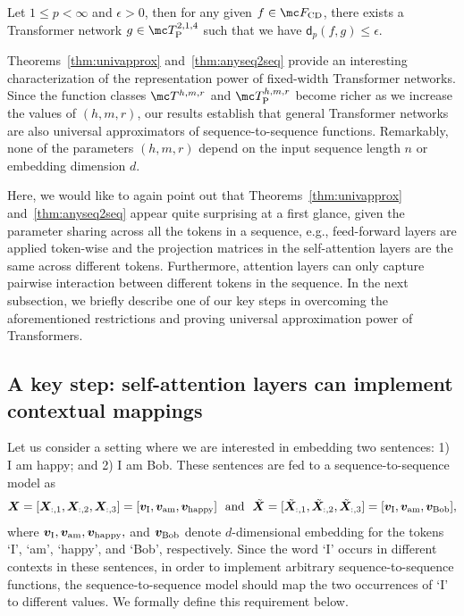 \documentclass{article} %
\def\vv{{\bm{v}}}
\def\mX{{\bm{X}}}
\newcommand{\funcdist}{\mathsf{d}}
\begin{document}
\begin{theorem}
\label{thm:anyseq2seq}
Let $1 \leq p < \infty$ and $\epsilon > 0$, then for any given $f \in \mc F_{\rm CD}$, there exists a Transformer network $g \in \mc T^{2,1,4}_{\rm P}$ such that we have $\funcdist_p(f,g) \leq \epsilon$. 
\end{theorem}
\vspace{-2pt}
Theorems~\ref{thm:univapprox} and~\ref{thm:anyseq2seq} provide an interesting characterization of the representation power of fixed-width Transformer networks. Since the function classes $\mc T^{h, m, r}$ and $\mc T^{h, m, r}_{\rm P}$ become richer as we increase the values of $(h, m, r)$, our results establish that general Transformer networks are also universal approximators of sequence-to-sequence functions. Remarkably, none of the parameters $(h, m, r)$ depend on the input sequence length $n$ or embedding dimension $d$. 

Here, we would like to again point out that Theorems~\ref{thm:univapprox} and~\ref{thm:anyseq2seq} appear quite surprising at a first glance, given the parameter sharing across all the tokens in a sequence, e.g., feed-forward layers are applied token-wise and the projection matrices in the self-attention layers are the same across different tokens. Furthermore, attention layers can only capture pairwise interaction between different tokens in the sequence. 
In the next subsection, we briefly describe one of our key steps in overcoming the aforementioned restrictions and proving universal approximation power of Transformers.

\vspace*{-3pt}
\subsection{A key step: self-attention layers can implement contextual mappings}
\vspace*{-3pt}
\label{sec:contextual-mapping}
Let us consider a setting where we are interested in embedding two sentences: 1) I am happy; and 2) I am Bob. These sentences are fed to a sequence-to-sequence model as 
$$
\mX = [\mX_{:,1}, \mX_{:,2}, \mX_{:,3}] = [\vv_{\rm I}, \vv_{\rm am}, \vv_{\rm happy}]~~\text{and}~~\tilde{\mX} = [\tilde{\mX}_{:,1}, \tilde{\mX}_{:,2}, \tilde{\mX}_{:,3}] = [\vv_{\rm I}, \vv_{\rm am}, \vv_{\rm Bob}],
$$
where $\vv_{\rm I}, \vv_{\rm am}, \vv_{\rm happy},$ and $\vv_{\rm Bob}$ denote $d$-dimensional embedding for the tokens `I', `am', `happy', and `Bob', respectively. Since the word `I' occurs in different contexts in these sentences, in order to implement arbitrary sequence-to-sequence functions, the sequence-to-sequence model should map the two occurrences of `I' to different values. We formally define this requirement below.
\end{document}
